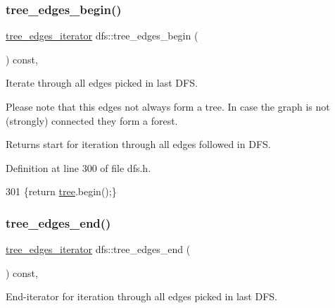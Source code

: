 \subsubsection{\texorpdfstring{tree\+\_\+edges\+\_\+begin()}{tree\_edges\_begin()}}
{\footnotesize\ttfamily \mbox{\hyperlink{classdfs_accde8d5403404f6d22fe4756d4ffedd5}{tree\+\_\+edges\+\_\+iterator}} dfs\+::tree\+\_\+edges\+\_\+begin (\begin{DoxyParamCaption}{ }\end{DoxyParamCaption}) const\hspace{0.3cm}{\ttfamily [inline]}, {\ttfamily [inherited]}}



Iterate through all edges picked in last D\+FS. 

Please note that this edges not always form a tree. In case the graph is not (strongly) connected they form a forest.

\begin{DoxyReturn}{Returns}
start for iteration through all edges followed in D\+FS. 
\end{DoxyReturn}


Definition at line 300 of file dfs.\+h.


\begin{DoxyCode}
301     \{\textcolor{keywordflow}{return} \mbox{\hyperlink{classdfs_aed496b618a937723bfec0b463e17e8d5}{tree}}.begin();\}
\end{DoxyCode}
\mbox{\label{classdfs_ad1b9f759569cb52ba7ee415862c79831}} 
\subsubsection{\texorpdfstring{tree\+\_\+edges\+\_\+end()}{tree\_edges\_end()}}
{\footnotesize\ttfamily \mbox{\hyperlink{classdfs_accde8d5403404f6d22fe4756d4ffedd5}{tree\+\_\+edges\+\_\+iterator}} dfs\+::tree\+\_\+edges\+\_\+end (\begin{DoxyParamCaption}{ }\end{DoxyParamCaption}) const\hspace{0.3cm}{\ttfamily [inline]}, {\ttfamily [inherited]}}



End-\/iterator for iteration through all edges picked in last D\+FS. 

